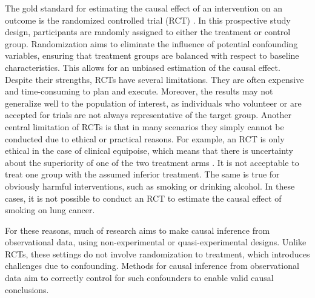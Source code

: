The gold standard for estimating the causal effect of an intervention on an outcome is the randomized controlled trial (RCT) \citep{hariton2018}. In this prospective study design, participants are randomly assigned to either the treatment or control group. Randomization aims to eliminate the influence of potential confounding variables, ensuring that treatment groups are balanced with respect to baseline characteristics. This allows for an unbiased estimation of the causal effect. Despite their strengths, RCTs have several limitations. They are often expensive and time-consuming to plan and execute. Moreover, the results may not generalize well to the population of interest, as individuals who volunteer or are accepted for trials are not always representative of the target group. Another central limitation of RCTs is that in many scenarios they simply cannot be conducted due to ethical or practical reasons. For example, an RCT is only ethical in the case of clinical equipoise, which means that there is uncertainty about the superiority of one of the two treatment arms \citep{freedman1987}. It is not acceptable to treat one group with the assumed inferior treatment. The same is true for obviously harmful interventions, such as smoking or drinking alcohol. In these cases, it is not possible to conduct an RCT to estimate the causal effect of smoking on lung cancer. 

For these reasons, much of research aims to make causal inference from observational data, using non-experimental or quasi-experimental designs. Unlike RCTs, these settings do not involve randomization to treatment, which introduces challenges due to confounding. Methods for causal inference from observational data aim to correctly control for such confounders to enable valid causal conclusions. 


